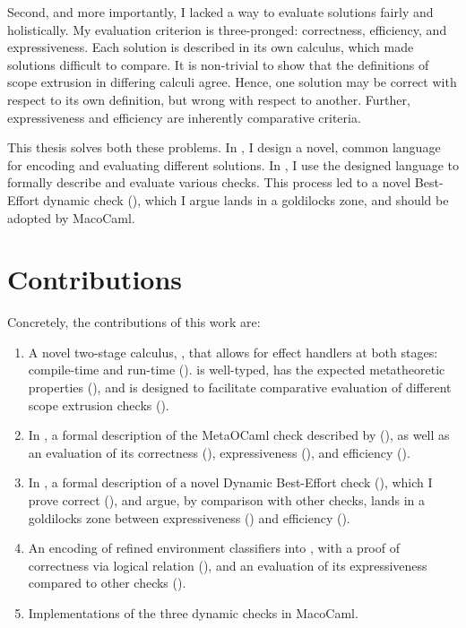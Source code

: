 Second, and more importantly, I lacked a way to evaluate solutions fairly and holistically. My evaluation criterion is three-pronged: correctness, efficiency, and expressiveness. Each solution is described in its own calculus, which made solutions difficult to compare. It is non-trivial to show that the definitions of scope extrusion in differing calculi agree. Hence, one solution may be correct with respect to its own definition, but wrong with respect to another. Further, expressiveness and efficiency are inherently comparative criteria.

This thesis solves both these problems. In , I design a novel, common language for encoding and evaluating different solutions. In , I use the designed language to formally describe and evaluate various checks. This process led to a novel Best-Effort dynamic check (), which I argue lands in a goldilocks zone, and should be adopted by MacoCaml.

\section{Contributions}

Concretely, the contributions of this work are:
\begin{enumerate}
    \item A novel two-stage calculus, \calculusName{}, that allows for effect handlers at both stages: compile-time and run-time (). \calculusName{} is well-typed, has the expected metatheoretic properties (), and is designed to facilitate comparative evaluation of different scope extrusion checks ().
    \item In \calculusName{}, a formal description of the MetaOCaml check described by \citet{kiselyov-14} (), as well as an evaluation of its correctness (), expressiveness (), and efficiency ().
    \item In \calculusName{}, a formal description of a novel Dynamic Best-Effort check (), which I prove correct (), and argue, by comparison with other checks, lands in a goldilocks zone between expressiveness () and efficiency (). 
    \item An encoding of refined environment classifiers \citep{kiselyov-16} into \calculusName{}, with a proof of correctness via logical relation (), and an evaluation of its expressiveness compared to other checks ().
    \item Implementations of the three dynamic checks in MacoCaml.
\end{enumerate}

